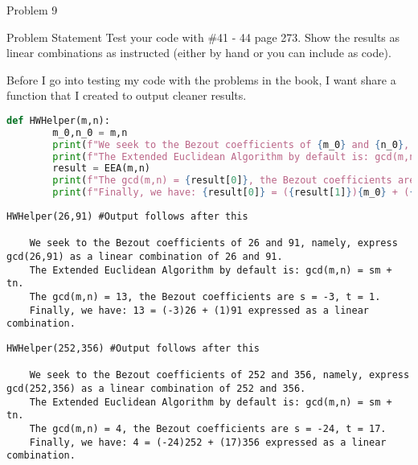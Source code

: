 \begin{problem}{Problem 9}
    \begin{statement}{Problem Statement}
        Test your code with \#41 - 44 page 273. Show the results as linear combinations as instructed (either by hand or you can include as code).
    \end{statement}

    \begin{Highlight}
        Before I go into testing my code with the problems in the book, I want share a function that I created to output cleaner results.

    \begin{lstlisting}[style=stackoverflow, language=python]
    def HWHelper(m,n):
        m_0,n_0 = m,n
        print(f"We seek to the Bezout coefficients of {m_0} and {n_0}, namely, express gcd({m_0},{n_0}) as a linear combination of {m_0} and {n_0}.")
        print(f"The Extended Euclidean Algorithm by default is: gcd(m,n) = sm + tn.")
        result = EEA(m,n)
        print(f"The gcd(m,n) = {result[0]}, the Bezout coefficients are s = {result[1]}, t = {result[2]}.")
        print(f"Finally, we have: {result[0]} = ({result[1]}){m_0} + ({result[2]}){n_0} expressed as a linear combination.")
    \end{lstlisting}
    \end{Highlight}

    \begin{Highlight}[Solution - \# 41]
    \begin{lstlisting}[style=stackoverflow]
    HWHelper(26,91) #Output follows after this

    We seek to the Bezout coefficients of 26 and 91, namely, express gcd(26,91) as a linear combination of 26 and 91.
    The Extended Euclidean Algorithm by default is: gcd(m,n) = sm + tn.
    The gcd(m,n) = 13, the Bezout coefficients are s = -3, t = 1.
    Finally, we have: 13 = (-3)26 + (1)91 expressed as a linear combination.
    \end{lstlisting}
    \end{Highlight}

    \begin{Highlight}[Solution - \# 42]
    \begin{lstlisting}[style=stackoverflow]
    HWHelper(252,356) #Output follows after this

    We seek to the Bezout coefficients of 252 and 356, namely, express gcd(252,356) as a linear combination of 252 and 356.
    The Extended Euclidean Algorithm by default is: gcd(m,n) = sm + tn.
    The gcd(m,n) = 4, the Bezout coefficients are s = -24, t = 17.
    Finally, we have: 4 = (-24)252 + (17)356 expressed as a linear combination.
    \end{lstlisting}
    \end{Highlight}


\end{problem}
